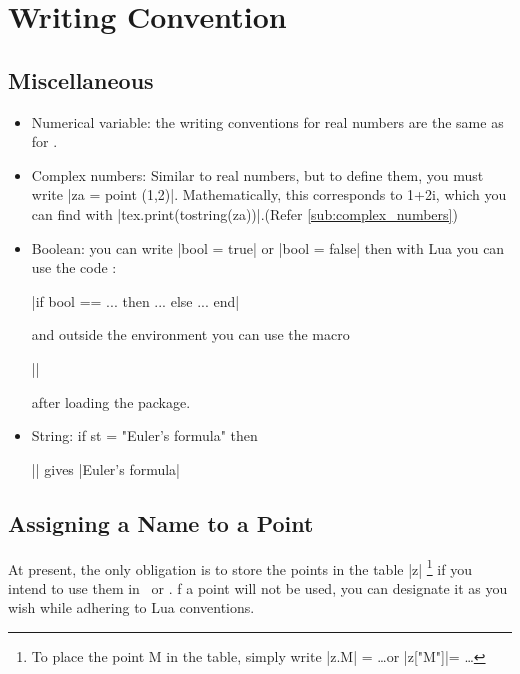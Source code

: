 \newpage

\section{Writing Convention} %
\label{sec:writing_convention}

\subsection{Miscellaneous} %
\label{sub:miscellanous}

\begin{itemize}
   \item Numerical variable: the writing conventions for real numbers are the same as for .
   \item Complex numbers: Similar to real numbers, but to define them, you must write |za = point (1,2)|. Mathematically, this corresponds to 1+2i, which you can find with |tex.print(tostring(za))|.(Refer \ref{sub:complex_numbers})
   \item Boolean: you can write |bool = true| or |bool = false| then with Lua you can use the code :\\
 \begin{mybox}
|if bool == ... then ... else ... end|
\end{mybox}
 
 and outside the environment  you can use the macro 
\begin{mybox}
 ||
\end{mybox}

     after loading the  package.
   
   \item String: if st = "Euler's formula" then \begin{mybox}
      || gives |Euler's formula|
   \end{mybox}
   

\end{itemize}

\subsection{Assigning a Name to a Point} %
\label{sub:assigning_a_name_to_a_point}

At present,  the only obligation is to store the points in the table |z| \footnote{To place the point M in the table, simply write |z.M| = \ldots or |z["M"]|= \ldots} if you intend to use them in \TIKZ\ or . f a point will not be used, you can designate it as you wish while adhering to Lua conventions. 

